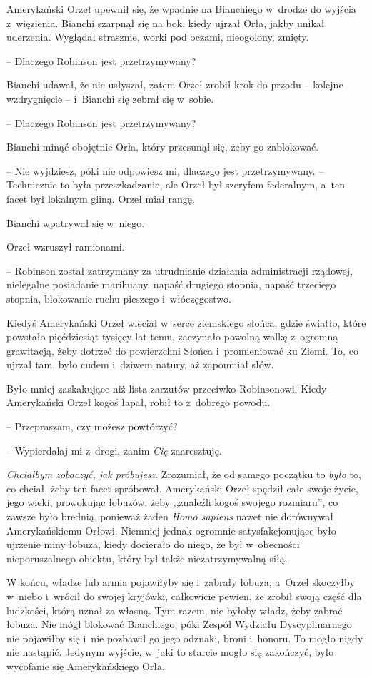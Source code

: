 \documentclass[oneside,polish,11pt,sfheadings]{mwbk}
\begin{document}
Amerykański Orzeł upewnił się, że wpadnie na Bianchiego w~drodze do
wyjścia z~więzienia. Bianchi szarpnął się na bok, kiedy ujrzał Orła,
jakby unikał uderzenia. Wyglądał strasznie, worki pod oczami,
nieogolony, zmięty.

-- Dlaczego Robinson jest przetrzymywany?

Bianchi udawał, że nie usłyszał, zatem Orzeł zrobił krok do przodu -- kolejne wzdrygnięcie -- i~Bianchi się zebrał się w~sobie.

-- Dlaczego Robinson jest przetrzymywany?

Bianchi minąć obojętnie Orła, który przesunął się, żeby go zablokować. 

-- Nie wyjdziesz, póki nie odpowiesz mi, dlaczego jest przetrzymywany. -- Technicznie to była przeszkadzanie, ale Orzeł był szeryfem federalnym, a~ten facet był lokalnym gliną. Orzeł miał rangę.

Bianchi wpatrywał się w~niego.

Orzeł wzruszył ramionami.

-- Robinson został zatrzymany za utrudnianie działania administracji
rządowej, nielegalne posiadanie marihuany, napaść drugiego stopnia,
napaść trzeciego stopnia, blokowanie ruchu pieszego i~włóczęgostwo.

Kiedyś Amerykański Orzeł wleciał w~serce ziemskiego słońca, gdzie
światło, które powstało pięćdziesiąt tysięcy lat temu, zaczynało powolną
walkę z~ogromną grawitacją, żeby dotrzeć do powierzchni Słońca i~promieniować ku Ziemi. To, co ujrzał tam, było cudem i~dziwem natury, aż
zapomniał słów.

Było mniej zaskakujące niż lista zarzutów przeciwko Robinsonowi. Kiedy
Amerykański Orzeł kogoś łapał, robił to z~dobrego powodu.

-- Przepraszam, czy możesz powtórzyć?

-- Wypierdalaj mi z~drogi, zanim \textit{Cię} zaaresztuję.

\textit{Chciałbym zobaczyć, jak próbujesz}. Zrozumiał, że od samego
początku to \textit{było} to, co chciał, żeby ten facet spróbował.
Amerykański Orzeł spędził całe swoje życie, jego wieki, prowokując
łobuzów, żeby ,,znaleźli kogoś swojego rozmiaru'', co zawsze było
brednią, ponieważ żaden \textit{Homo sapiens} nawet nie dorównywał
Amerykańskiemu Orłowi. Niemniej jednak ogromnie satysfakcjonujące było
ujrzenie miny łobuza, kiedy docierało do niego, że był w~obecności
nieporuszalnego obiektu, który był także niezatrzymywalną siłą.

W końcu, władze lub armia pojawiłyby się i~zabrały łobuza, a~Orzeł
skoczyłby w~niebo i~wrócił do swojej kryjówki, całkowicie pewien, że
zrobił swoją część dla ludzkości, którą uznał za własną. Tym razem, nie
byłoby władz, żeby zabrać łobuza. Nie mógł blokować Bianchiego, póki
Zespół Wydziału Dyscyplinarnego nie pojawiłby się i~nie pozbawił go jego
odznaki, broni i~honoru. To mogło nigdy nie nastąpić. Jedynym wyjście, w~jaki to starcie mogło się zakończyć, było wycofanie się Amerykańskiego
Orła.
\end{document}
